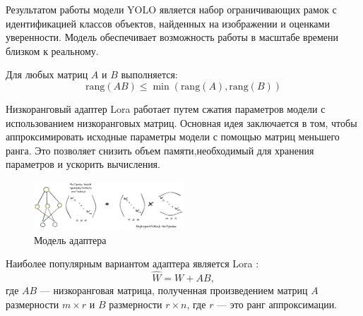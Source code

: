Результатом работы модели YOLO является набор ограничивающих рамок с идентификацией классов объектов, найденных на изображении и оценками уверенности. 
Модель обеспечивает возможность работы в масштабе времени близком к реальному.


Для любых матриц $A$ и $B$ выполняется:
\begin{equation}
    \text{rang}(AB) \le \min\left(\text{rang}(A),\text{rang}(B)\right)
\end{equation}
   
Низкоранговый адаптер Lora работает путем сжатия параметров модели с использованием низкоранговых матриц. Основная идея заключается в том, 
чтобы аппроксимировать исходные параметры модели с помощью матриц меньшего ранга. Это позволяет снизить объем памяти,необходимый для хранения 
параметров и ускорить вычисления.
\begin{figure}[h]
    \centering
    \includegraphics[width=0.5\textwidth]{assets/ml/adapter/adapter.excalidraw.png}
    \caption{Модель адаптера  \cite{hu2021lora}}
    \label{sd_learning}
\end{figure}

Наиболее популярным вариантом адаптера является Lora \cite{hu2021lora}:
\begin{equation}
    \hat{W} = W + AB,
\end{equation}
где  $AB$ --- низкоранговая матрица, полученная произведением матриц $A$ размерности \( m \times r \) и  $B$ размерности  $r \times n$,
где \( r \) --- это ранг аппроксимации.

